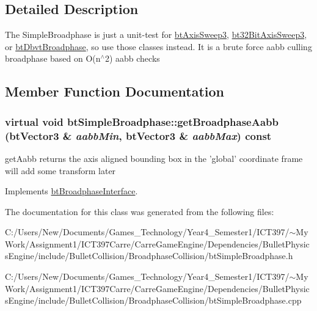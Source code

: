 \subsection{Detailed Description}
The SimpleBroadphase is just a unit-test for \hyperlink{classbt_axis_sweep3}{btAxisSweep3}, \hyperlink{classbt32_bit_axis_sweep3}{bt32BitAxisSweep3}, or \hyperlink{structbt_dbvt_broadphase}{btDbvtBroadphase}, so use those classes instead. It is a brute force aabb culling broadphase based on O(n$^\wedge$2) aabb checks 

\subsection{Member Function Documentation}
\hypertarget{classbt_simple_broadphase_8753363773ebbfeb48f8cf5594429dc2}{
\subsubsection[getBroadphaseAabb]{\setlength{\rightskip}{0pt plus 5cm}virtual void btSimpleBroadphase::getBroadphaseAabb (btVector3 \& {\em aabbMin}, \/  btVector3 \& {\em aabbMax}) const}}
\label{classbt_simple_broadphase_8753363773ebbfeb48f8cf5594429dc2}


getAabb returns the axis aligned bounding box in the 'global' coordinate frame will add some transform later 

Implements \hyperlink{classbt_broadphase_interface_b5af9e26414f5a72a76040b8fab4d9e2}{btBroadphaseInterface}.

The documentation for this class was generated from the following files:\begin{CompactItemize}
\item 
C:/Users/New/Documents/Games\_\-Technology/Year4\_\-Semester1/ICT397/$\sim$My Work/Assignment1/ICT397Carre/CarreGameEngine/Dependencies/BulletPhysicsEngine/include/BulletCollision/BroadphaseCollision/btSimpleBroadphase.h\item 
C:/Users/New/Documents/Games\_\-Technology/Year4\_\-Semester1/ICT397/$\sim$My Work/Assignment1/ICT397Carre/CarreGameEngine/Dependencies/BulletPhysicsEngine/include/BulletCollision/BroadphaseCollision/btSimpleBroadphase.cpp\end{CompactItemize}
